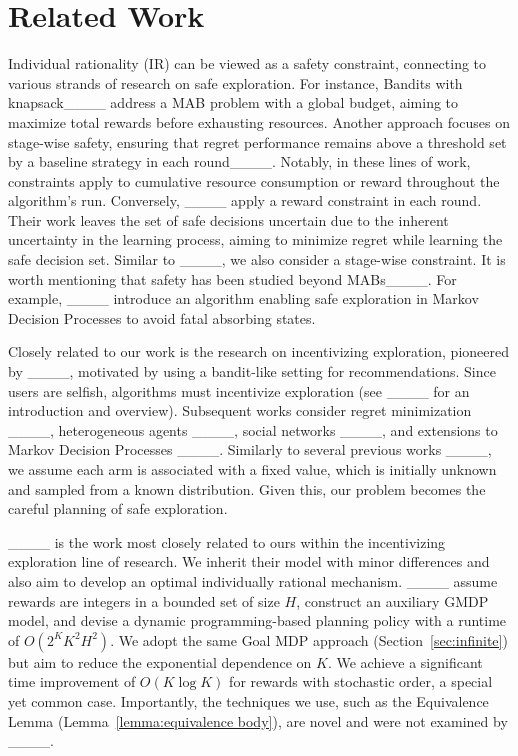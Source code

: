 \section{Related Work}
\label{subsec:related}
Individual rationality (IR) can be viewed as a safety constraint, connecting to various strands of research on safe exploration. For instance, Bandits with knapsack____ address a MAB problem with a global budget, aiming to maximize total rewards before exhausting resources. Another approach focuses on stage-wise safety, ensuring that regret performance remains above a threshold set by a baseline strategy in each round____. Notably, in these lines of work, constraints apply to cumulative resource consumption or reward throughout the algorithm's run. Conversely, ____ apply a reward constraint in each round. Their work leaves the set of safe decisions uncertain due to the inherent uncertainty in the learning process, aiming to minimize regret while learning the safe decision set. Similar to ____, we also consider a stage-wise constraint. It is worth mentioning that safety has been studied beyond MABs____. For example, ____ introduce  an algorithm enabling safe exploration in Markov Decision Processes to avoid fatal absorbing states. 

Closely related to our work is the research on incentivizing exploration, pioneered by ____, motivated by using a bandit-like setting for recommendations. Since users are selfish, algorithms must incentivize exploration (see ____ for an introduction and overview). Subsequent works consider regret minimization ____, heterogeneous agents ____, social networks ____, and extensions to Markov Decision Processes ____. Similarly to several previous works ____, we assume each arm is associated with a fixed value, which is initially unknown and sampled from a known distribution. Given this, our problem becomes the careful planning of safe exploration.

____ is the work most closely related to ours within the incentivizing exploration line of research. We inherit their model with minor differences and also aim to develop an optimal individually rational mechanism. ____ assume rewards are integers in a bounded set of size $H$, construct an auxiliary GMDP model, and devise a dynamic programming-based planning policy with a runtime of $O(2^K K^2 H^2)$. We adopt the same Goal MDP approach (Section~\ref{sec:infinite}) but aim to reduce the exponential dependence on $K$. We achieve a significant time improvement of $O(K \log K)$ for rewards with stochastic order, a special yet common case. Importantly, the techniques we use, such as the Equivalence Lemma (Lemma~\ref{lemma:equivalence body}), are novel and were not examined by ____.